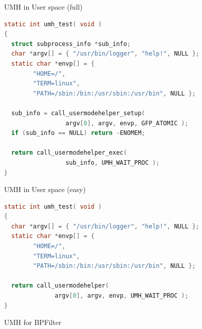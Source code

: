 \begin{reveals}

\begin{frame}[c,fragile]{UMH in User space (full)}

\begin{lstlisting}[language=C]
static int umh_test( void )
{
  struct subprocess_info *sub_info;
  char *argv[] = { "/usr/bin/logger", "help!", NULL };
  static char *envp[] = {
        "HOME=/",
        "TERM=linux",
        "PATH=/sbin:/bin:/usr/sbin:/usr/bin", NULL };

  sub_info = call_usermodehelper_setup( 
                 argv[0], argv, envp, GFP_ATOMIC );
  if (sub_info == NULL) return -ENOMEM;

  return call_usermodehelper_exec( 
                 sub_info, UMH_WAIT_PROC );
}
\end{lstlisting}
\end{frame}
\begin{frame}[c,fragile]{UMH in User space (easy)}

\begin{lstlisting}[language=C]
static int umh_test( void )
{
  char *argv[] = { "/usr/bin/logger", "help!", NULL };
  static char *envp[] = {
        "HOME=/",
        "TERM=linux",
        "PATH=/sbin:/bin:/usr/sbin:/usr/bin", NULL };

  return call_usermodehelper( 
              argv[0], argv, envp, UMH_WAIT_PROC );
}
\end{lstlisting}
\end{frame}

\begin{frame}[c]{UMH for BPFilter}
  

\end{frame}
\end{reveals}
